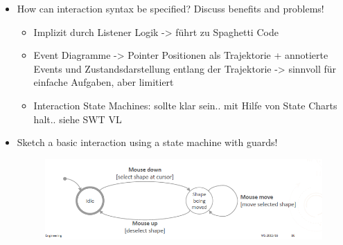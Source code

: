 \begin{itemize}
	\item How can interaction syntax be specified? Discuss benefits and problems!\\
	\begin{itemize}
		\item Implizit durch Listener Logik -> führt zu Spaghetti Code
		\item Event Diagramme -> Pointer Positionen als Trajektorie + annotierte Events und Zustandsdarstellung entlang der Trajektorie -> sinnvoll für einfache Aufgaben, aber limitiert
		\item Interaction State Machines: sollte klar sein.. mit Hilfe von State Charts halt.. siehe SWT VL
	\end{itemize}
	
	\item Sketch a basic interaction using a state machine with guards!\\
	\begin{figure}[!h]
		\centering
		\includegraphics[scale=0.5]{img/state_interaction.png}
	\end{figure}
	
\end{itemize}